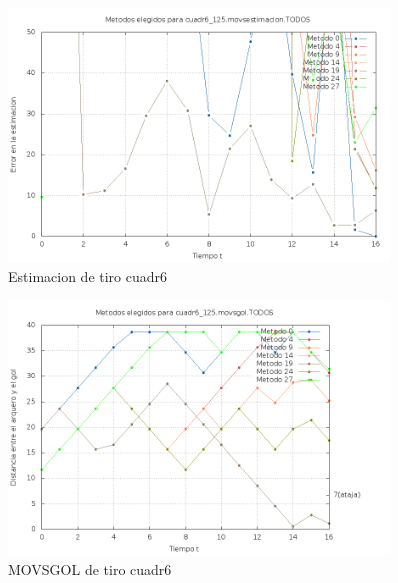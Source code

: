 \begin{figure}[H]
\begin{center}
\includegraphics[width=0.9\textwidth]{img/cuadr6_125_movsestimacion_TODOS_elegidos.png}
     \caption{Estimacion de tiro cuadr6}
\end{center}
\end{figure}

\begin{figure}[H]
\begin{center}
\includegraphics[width=0.9\textwidth]{img/cuadr6_125_movsgol_TODOS_elegidos.png}
     \caption{MOVSGOL de tiro cuadr6}
\end{center}
\end{figure}


